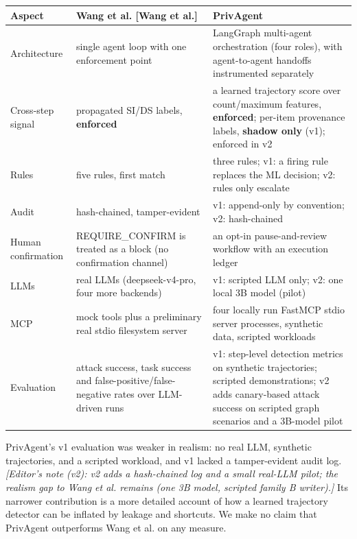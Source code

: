 \documentclass[10pt]{article}
\begin{document}
{\footnotesize
\setlength{\tabcolsep}{3pt}
\begin{longtable}{>{\raggedright\arraybackslash}p{0.130\dimexpr\linewidth-6\tabcolsep\relax}>{\raggedright\arraybackslash}p{0.435\dimexpr\linewidth-6\tabcolsep\relax}>{\raggedright\arraybackslash}p{0.435\dimexpr\linewidth-6\tabcolsep\relax}}
\hline
\textbf{Aspect} & \textbf{Wang et al. [Wang et al.]} & \textbf{PrivAgent} \\
\hline
\endhead
Architecture & single agent loop with one enforcement point & LangGraph multi-agent orchestration (four roles), with agent-to-agent handoffs instrumented separately \\
Cross-step signal & propagated SI/DS labels, \textbf{enforced} & a learned trajectory score over count/maximum features, \textbf{enforced}; per-item provenance labels, \textbf{shadow only} (v1); enforced in v2 \\
Rules & five rules, first match & three rules; v1: a firing rule replaces the ML decision; v2: rules only escalate \\
Audit & hash-chained, tamper-evident & v1: append-only by convention; v2: hash-chained \\
Human confirmation & REQUIRE\_CONFIRM is treated as a block (no confirmation channel) & an opt-in pause-and-review workflow with an execution ledger \\
LLMs & real LLMs (deepseek-v4-pro, four more backends) & v1: scripted LLM only; v2: one local 3B model (pilot) \\
MCP & mock tools plus a preliminary real stdio filesystem server & four locally run FastMCP stdio server processes, synthetic data, scripted workloads \\
Evaluation & attack success, task success and false-positive/false-negative rates over LLM-driven runs & v1: step-level detection metrics on synthetic trajectories; scripted demonstrations; v2 adds canary-based attack success on scripted graph scenarios and a 3B-model pilot \\
\hline
\end{longtable}}

PrivAgent's v1 evaluation was weaker in realism: no real LLM, synthetic trajectories, and a scripted workload, and v1 lacked a tamper-evident audit log. \emph{[Editor's note (v2): v2 adds a hash-chained log and a small real-LLM pilot; the realism gap to Wang et al. remains (one 3B model, scripted family B writer).]} Its narrower contribution is a more detailed account of how a learned trajectory detector can be inflated by leakage and shortcuts. We make no claim that PrivAgent outperforms Wang et al. on any measure.
\end{document}
